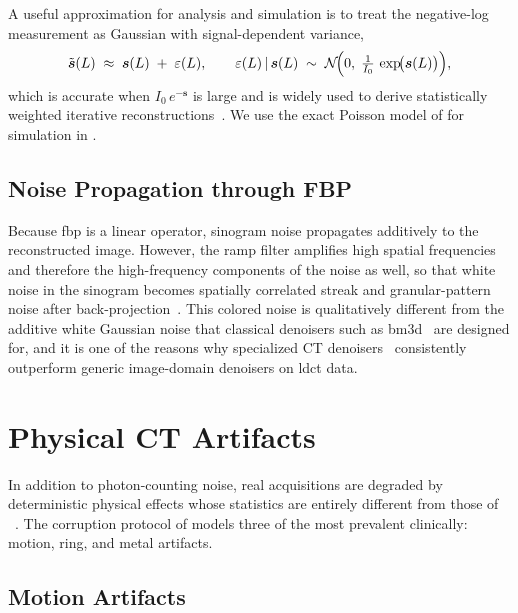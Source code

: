 A useful approximation for analysis and simulation is to treat the negative-log measurement as Gaussian with signal-dependent variance,
\begin{equation}
    \tilde{\boldsymbol{s}}(L) \;\approx\; \boldsymbol{s}(L) \;+\; \varepsilon(L),
    \qquad \varepsilon(L)\,|\,\boldsymbol{s}(L) \;\sim\; \mathcal{N}\!\Bigl(0,\;\tfrac{1}{I_{0}}\,\exp\!\bigl(\boldsymbol{s}(L)\bigr)\Bigr),
    \label{eq:gaussian_approx}
\end{equation}
which is accurate when $I_{0}\,e^{-\boldsymbol{s}}$ is large and is widely used to derive statistically weighted iterative
reconstructions~\cite{Whiting2006, Sadia2024}. We use the exact Poisson model of  for simulation in .

\subsection{Noise Propagation through FBP}
\label{subsec:bg_noise_propagation}

Because \gls{fbp} is a linear operator, sinogram noise propagates additively to the reconstructed image. However, the ramp filter amplifies high spatial frequencies and therefore the high-frequency components of the noise as well, so that white noise in the sinogram becomes spatially correlated streak and granular-pattern noise after
back-projection~\cite{KakSlaney1988, Leuschner2021}. This colored noise is qualitatively different from the additive white Gaussian noise that classical denoisers such
as \gls{bm3d}~\cite{Dabov2007} are designed for, and it is one of the reasons why specialized CT denoisers~\cite{Chen2017, Komolafe2024} consistently outperform
generic image-domain denoisers on \gls{ldct} data.

\section{Physical CT Artifacts}
\label{sec:bg_artifacts}

In addition to photon-counting noise, real acquisitions are degraded by deterministic physical effects whose statistics are entirely different from those of
~\cite{Boas2012}. The corruption protocol of  models three of the most prevalent clinically: motion, ring, and metal artifacts.

\subsection{Motion Artifacts}
\label{subsec:bg_motion}

